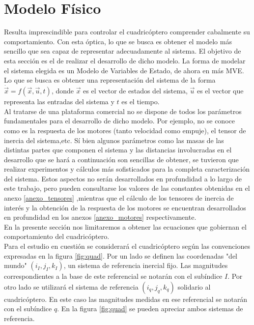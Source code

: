 \documentclass[main]{subfiles}
\begin{document}
\chapter{Modelo F\'isico}
\label{chap:modelo}
Resulta imprescindible para controlar el cuadric\'optero comprender cabalmente su comportamiento. Con esta \'optica, lo que se busca es obtener el modelo m\'as sencillo que sea capaz de representar adecuadamente al sistema. El objetivo de esta secci\'on es el de realizar el desarrollo de dicho modelo. La forma de modelar el sistema elegida es un Modelo de Variables de Estado, de ahora en m\'as MVE. Lo que se busca es obtener una representaci\'on del sistema de la forma $\dot{\overrightarrow{x}}=f\left(\overrightarrow{x},\overrightarrow{u},t\right)$, donde $\overrightarrow{x}$ es el vector de estados del sistema, $\overrightarrow{u}$ es el vector que representa las entradas del sistema y $t$ es el tiempo. \\

Al tratarse de una plataforma comercial no se dispone de todos los par\'ametros fundamentales para el desarrollo de dicho modelo. Por ejemplo, no se conoce como es la respuesta de los motores (tanto velocidad como empuje), el tensor de inercia del sistema,etc. S\'i bien algunos par\'ametros como las masas de las distintas partes que componen el sistema y las distancias involucradas en el desarrollo que se har\'a a continuaci\'on son sencillas de obtener, se tuvieron que realizar experimentos y c\'alculos m\'as sofisticados para la completa caracterizaci\'on del sistema. Estos aspectos no ser\'an desarrollados en profundidad a lo largo de este trabajo, pero pueden consultarse los valores de las constantes obtenidas   en el anexo \ref{anexo_tensores}
,mientras que el c\'alculo de los tensores de inercia de inter\'es
 y la obtenci\'on de la respuesta de los motores se encuentran desarrollados en profundidad en los anexos \ref{anexo_motores}
respectivamente.\\

En la presente secci\'on nos limitaremos a obtener las ecuaciones que gobiernan el comportamiento del cuadric\'optero.\\


Para el estudio en cuesti\'on se considerar\'a el cuadric\'optero seg\'un las convenciones expresadas en la figura \ref{fig:quad}. Por un lado se definen las coordenadas "del mundo" $(i_I , j_I , k_I )$, un sistema de referencia inercial fijo. Las magnitudes correspondientes a la base de este referencial se notar\'an
con el sub\'indice $I$. Por otro lado se utilizar\'a el sistema de referencia $(i_q , j_q , k_q )$ solidario al cuadric\'optero. En este caso las magnitudes medidas en ese referencial se notar\'an con el sub\'indice $q$. En la figura \ref{fig:quad} se pueden apreciar ambos sistemas de referencia.
\end{document}
